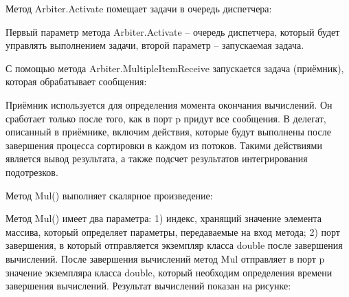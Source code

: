Метод Arbiter.Activate помещает задачи в очередь диспетчера:

\begin{figure}[h!]
\end{figure}

Первый параметр метода Arbiter.Activate – очередь диспетчера,
который будет управлять выполнением задачи, второй параметр –
запускаемая задача.

С помощью метода Arbiter.MultipleItemReceive запускается задача
(приёмник), которая обрабатывает сообщения:

\begin{figure}[h!]
\end{figure}

Приёмник используется для определения момента окончания
вычислений. Он сработает только после того, как в порт p придут все сообщения. В делегат, описанный в приёмнике,  включим действия,
которые будут выполнены после завершения процесса сортировки в каждом из потоков. Такими действиями является вывод результата, а также подсчет результатов интегрирования подотрезков.

Метод Mul() выполняет скалярное произведение:

\begin{figure}[h!]
\end{figure}

Метод Mul() имеет два параметра:
1) индекс, хранящий значение элемента массива, который определяет
параметры, передаваемые на вход метода;
2) порт завершения, в который отправляется экземпляр класса double после
завершения вычислений.
После завершения вычислений метод Mul отправляет в порт p
значение экземпляра класса double, который необходим определения времени завершения вычислений.
Результат вычислений показан на рисунке:

